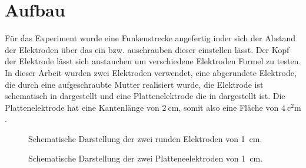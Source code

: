 \section{Aufbau}
\label{sec:setup}
Für das Experiment wurde eine Funkenstrecke angefertig inder sich der Abstand der Elektroden über das ein bzw. auschrauben dieser einstellen lässt. Der Kopf der Elektrode lässt sich austauchen um verschiedene Elektroden Formel zu testen. In dieser Arbeit wurden zwei Elektroden verwendet, eine abgerundete Elektrode, die durch eine aufgeschraubte Mutter realisiert wurde, die Elektrode ist schematisch in  dargestellt und eine Plattenelektrode die in  dargestellt ist. Die Plattenelektrode hat eine Kantenlänge von \(\SI{2}{\centi\meter}\), somit also eine Fläche von \(\SI{4}{\square\centi\meter}\).

\begin{figure}[H]
    \centering
    
    \caption{Schematische Darstellung der zwei runden Elektroden von \SI{1}{\centi\metre}.}
    \label{fig:setup_electrodes}
\end{figure}


\begin{figure}[H]
    \centering
    
    \caption{Schematische Darstellung der zwei Platteneelektroden von \SI{1}{\centi\metre}.}
    \label{fig:setup_plate_electrodes}
\end{figure}

